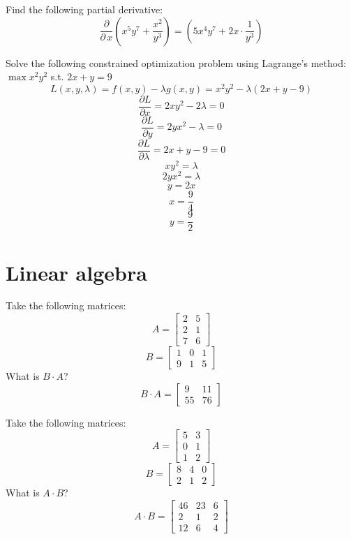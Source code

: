 \documentclass[10pt]{article}
\newenvironment{problem}[2][Problem]{\begin{trivlist}
\item[\hskip \labelsep {\bfseries #1}\hskip \labelsep {\bfseries #2.}]}{\end{trivlist}}
\begin{document}
\begin{problem}{3.10}
Find the following partial derivative:
$$\frac{\partial}{\partial \, x} \left(x^5y^7+\frac{x^2}{y^3}\right) = \left( 5x^4y^7 + 2x\cdot \frac{1}{y^3} \right)$$

\end{problem}


\begin{problem}{3.12}
Solve the following constrained optimization problem using Lagrange's method:
$\max x^2y^2$ s.t. $2x+y=9$
\medskip \\
$$L(x,y,\lambda) = f(x,y)-\lambda g(x,y) = x^2y^2-\lambda (2x+y-9) $$
$$ \frac{\partial L}{\partial x} = 2xy^2 - 2\lambda = 0$$
$$ \frac{\partial L}{\partial y} = 2yx^2 - \lambda = 0$$
$$ \frac{\partial L}{\partial \lambda} = 2x + y -9 = 0 $$
$$ xy^2 = \lambda $$
$$ 2yx^2 = \lambda $$
$$ y=2x$$
$$ x = \frac{9}{4} $$
$$ y = \frac{9}{2} $$
\end{problem}

\section{Linear algebra}

\begin{problem}{4.1}
Take the following matrices:
$$A=\begin{bmatrix} 2 & 5\\ 2 & 1 \\ 7 & 6\end{bmatrix}$$
$$B=\begin{bmatrix} 1 & 0 & 1\\9 & 1 & 5\end{bmatrix}$$
What is $B \cdot A$?
$$B \cdot A = \begin{bmatrix} 9 & 11\\ 55 & 76 \end{bmatrix} $$
\end{problem}

\begin{problem}{4.2}
Take the following matrices:
$$A=\begin{bmatrix} 5 & 3\\ 0 & 1 \\ 1 & 2\end{bmatrix}$$
$$B=\begin{bmatrix} 8 & 4 & 0\\2 & 1 & 2\end{bmatrix}$$
What is $A \cdot B$?
$$A \cdot B = \begin{bmatrix} 46 & 23 & 6\\ 2 & 1 & 2\\12 & 6 & 4\end{bmatrix} $$
\end{problem}
\end{document}

